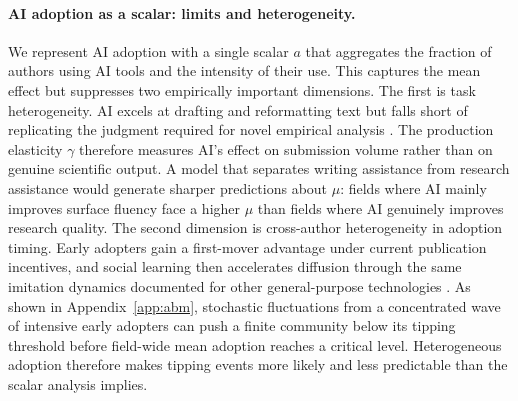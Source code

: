 \documentclass{article}
\begin{document}
\paragraph{AI adoption as a scalar: limits and heterogeneity.}
We represent AI adoption with a single scalar $a$ that aggregates the fraction of authors using AI tools and the intensity of their use.
This captures the mean effect but suppresses two empirically important dimensions.
The first is task heterogeneity.
AI excels at drafting and reformatting text but falls short of replicating the judgment required for novel empirical analysis \citep{Checco2021}.
The production elasticity $\gamma$ therefore measures AI's effect on submission volume rather than on genuine scientific output.
A model that separates writing assistance from research assistance would generate sharper predictions about $\mu$: fields where AI mainly improves surface fluency face a higher $\mu$ than fields where AI genuinely improves research quality.
The second dimension is cross-author heterogeneity in adoption timing.
Early adopters gain a first-mover advantage under current publication incentives, and social learning then accelerates diffusion through the same imitation dynamics documented for other general-purpose technologies \citep{Rogers2003}.
As shown in Appendix~\ref{app:abm}, stochastic fluctuations from a concentrated wave of intensive early adopters can push a finite community below its tipping threshold before field-wide mean adoption reaches a critical level.
Heterogeneous adoption therefore makes tipping events more likely and less predictable than the scalar analysis implies.
\end{document}
